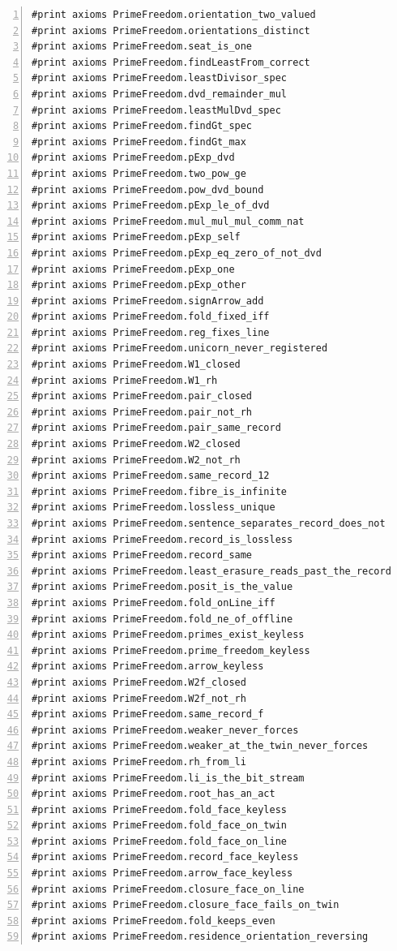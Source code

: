 \documentclass[10pt]{article}
\newcommand{\leansize}{\fontsize{5.5pt}{6.75pt}\selectfont}
\begin{document}
\begin{multicols}{2}
\begin{Verbatim}[numbers=left,firstnumber=1,numbersep=3pt,xleftmargin=2.6em,breaklines=true,breakanywhere=true,breakautoindent=false,breakindent=1.4em,breaksymbolleft={},breakanywheresymbolpre={},fontsize=\leansize]
#print axioms PrimeFreedom.orientation_two_valued
#print axioms PrimeFreedom.orientations_distinct
#print axioms PrimeFreedom.seat_is_one
#print axioms PrimeFreedom.findLeastFrom_correct
#print axioms PrimeFreedom.leastDivisor_spec
#print axioms PrimeFreedom.dvd_remainder_mul
#print axioms PrimeFreedom.leastMulDvd_spec
#print axioms PrimeFreedom.findGt_spec
#print axioms PrimeFreedom.findGt_max
#print axioms PrimeFreedom.pExp_dvd
#print axioms PrimeFreedom.two_pow_ge
#print axioms PrimeFreedom.pow_dvd_bound
#print axioms PrimeFreedom.pExp_le_of_dvd
#print axioms PrimeFreedom.mul_mul_mul_comm_nat
#print axioms PrimeFreedom.pExp_self
#print axioms PrimeFreedom.pExp_eq_zero_of_not_dvd
#print axioms PrimeFreedom.pExp_one
#print axioms PrimeFreedom.pExp_other
#print axioms PrimeFreedom.signArrow_add
#print axioms PrimeFreedom.fold_fixed_iff
#print axioms PrimeFreedom.reg_fixes_line
#print axioms PrimeFreedom.unicorn_never_registered
#print axioms PrimeFreedom.W1_closed
#print axioms PrimeFreedom.W1_rh
#print axioms PrimeFreedom.pair_closed
#print axioms PrimeFreedom.pair_not_rh
#print axioms PrimeFreedom.pair_same_record
#print axioms PrimeFreedom.W2_closed
#print axioms PrimeFreedom.W2_not_rh
#print axioms PrimeFreedom.same_record_12
#print axioms PrimeFreedom.fibre_is_infinite
#print axioms PrimeFreedom.lossless_unique
#print axioms PrimeFreedom.sentence_separates_record_does_not
#print axioms PrimeFreedom.record_is_lossless
#print axioms PrimeFreedom.record_same
#print axioms PrimeFreedom.least_erasure_reads_past_the_record
#print axioms PrimeFreedom.posit_is_the_value
#print axioms PrimeFreedom.fold_onLine_iff
#print axioms PrimeFreedom.fold_ne_of_offline
#print axioms PrimeFreedom.primes_exist_keyless
#print axioms PrimeFreedom.prime_freedom_keyless
#print axioms PrimeFreedom.arrow_keyless
#print axioms PrimeFreedom.W2f_closed
#print axioms PrimeFreedom.W2f_not_rh
#print axioms PrimeFreedom.same_record_f
#print axioms PrimeFreedom.weaker_never_forces
#print axioms PrimeFreedom.weaker_at_the_twin_never_forces
#print axioms PrimeFreedom.rh_from_li
#print axioms PrimeFreedom.li_is_the_bit_stream
#print axioms PrimeFreedom.root_has_an_act
#print axioms PrimeFreedom.fold_face_keyless
#print axioms PrimeFreedom.fold_face_on_twin
#print axioms PrimeFreedom.fold_face_on_line
#print axioms PrimeFreedom.record_face_keyless
#print axioms PrimeFreedom.arrow_face_keyless
#print axioms PrimeFreedom.closure_face_on_line
#print axioms PrimeFreedom.closure_face_fails_on_twin
#print axioms PrimeFreedom.fold_keeps_even
#print axioms PrimeFreedom.residence_orientation_reversing

\end{Verbatim}
\end{multicols}
\end{document}
